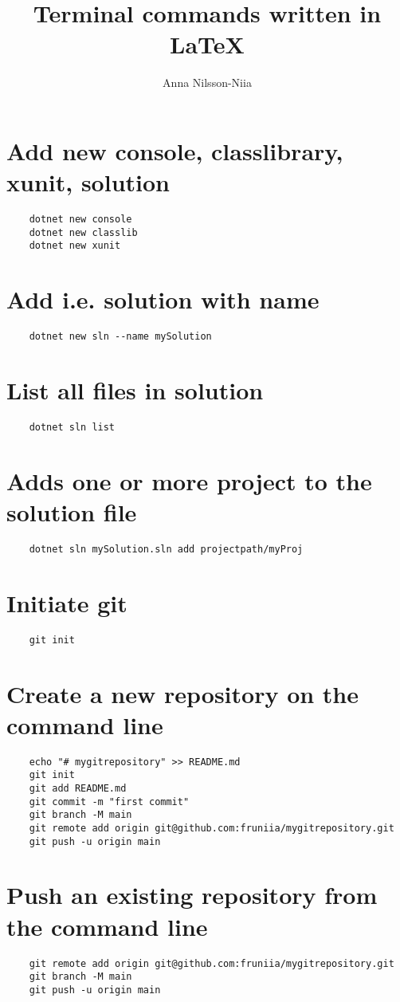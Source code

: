 \documentclass[10pt, a4paper]{article}
\title{Terminal commands written in \LaTeX}
\author{Anna Nilsson-Niia}
\begin{document}
\maketitle
\section{Add new console, classlibrary, xunit, solution}
\begin{verbatim}
    dotnet new console
    dotnet new classlib
    dotnet new xunit
\end{verbatim}
\section{Add i.e. solution with name}
\begin{verbatim}
    dotnet new sln --name mySolution
\end{verbatim}
\section{List all files in solution}
\begin{verbatim}
    dotnet sln list
\end{verbatim}
\section{Adds one or more project to the solution file}
\begin{verbatim}
    dotnet sln mySolution.sln add projectpath/myProj
\end{verbatim}
\section{Initiate git}
\begin{verbatim}
    git init
\end{verbatim}
\section{Create a new repository on the command line}
\begin{verbatim}
    echo "# mygitrepository" >> README.md
    git init
    git add README.md
    git commit -m "first commit"
    git branch -M main
    git remote add origin git@github.com:fruniia/mygitrepository.git
    git push -u origin main
\end{verbatim}
\section{Push an existing repository from the command line}
\begin{verbatim}
    git remote add origin git@github.com:fruniia/mygitrepository.git
    git branch -M main
    git push -u origin main
\end{verbatim}
\end{document}
